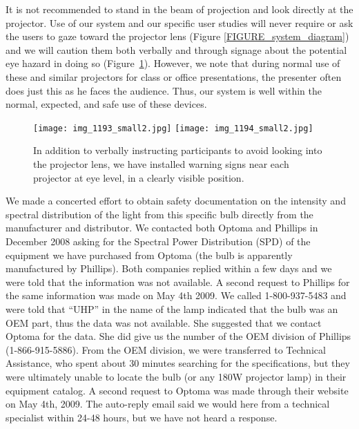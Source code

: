 \documentclass[10pt]{article}
\begin{document}
It is not recommended to stand in the beam of projection and look
directly at the projector.  Use of our system and our specific user
studies will never require or ask the users to gaze toward the
projector lens (Figure \ref{FIGURE_system_diagram}) and we will
caution them both verbally and through signage about the potential
eye hazard in doing so (Figure~\ref{FIGURE_warning_signs}).  However,
we note that during normal use of these and similar projectors for
class or office presentations, the presenter often does just this as
he faces the audience.  Thus, our system is well within the normal,
expected, and safe use of these devices.


\begin{figure}[t]
  \begin{center}
    \texttt{[image: img\_1193\_small2.jpg]}
    \texttt{[image: img\_1194\_small2.jpg]}
  \end{center}
  \caption{In addition to verbally instructing participants to avoid
    looking into the projector lens, we have installed warning signs
    near each projector at eye level, in a clearly visible position.
\label{FIGURE_warning_signs}
}
\end{figure}


We made a concerted effort to obtain safety documentation on the
intensity and spectral distribution of the light from this specific
bulb directly from the manufacturer and distributor.  We contacted
both Optoma and Phillips in December 2008 asking for the Spectral
Power Distribution (SPD) of the equipment we have purchased from
Optoma (the bulb is apparently manufactured by Phillips).  Both
companies replied within a few days and we were told that the
information was not available.  A second request to Phillips for the
same information was made on May 4th 2009.  We called 1-800-937-5483
and were told that ``UHP'' in the name of the lamp indicated that the
bulb was an OEM part, thus the data was not available.  She suggested
that we contact Optoma for the data.  She did give us the number of
the OEM division of Phillips (1-866-915-5886).  From the OEM division,
we were transferred to Technical Assistance, who spent about 30
minutes searching for the specifications, but they were ultimately
unable to locate the bulb (or any 180W projector lamp) in their
equipment catalog.
%
A second request to Optoma was made through their website on May 4th,
2009.  The auto-reply email said we would here from a technical
specialist within 24-48 hours, but we have not heard a response.  
\end{document}
